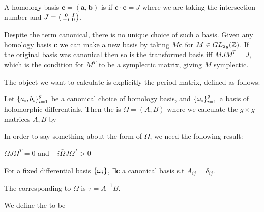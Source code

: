 \documentclass{article}
\begin{document}
\begin{definition}
	A homology basis $\bm{c} = (\bm{a},\bm{b})$ is  if $\bm{c} \cdot \bm{c} = J$ where we are taking the intersection number and $J=\begin{psmallmatrix} 0 & I \\ -I & 0 \end{psmallmatrix}$. 
\end{definition}
\begin{remark}
	Despite the term canonical, there is no unique choice of such a basis. Given any homology basis $\bm{c}$ we can make a new basis by taking $M\bm{c}$ for $M\in GL_{2g}(\mathbb{Z})$. If the original basis was canonical then so is the transformed basis iff $MJM^T = J$, which is the condition for $M^T$ to be a symplectic matrix, giving $M$ symplectic. 
\end{remark}

The object we want to calculate is explicitly the period matrix, defined as follows:
\begin{definition}\label{def: period matrix}
	Let $\left\{ a_i, b_i \right\}_{i=1}^g$ be a canonical choice of homology basis, and $\left\{ \omega_i \right\}_{i=1}^g$ a basis of holomorphic differentials. Then the  is $\Omega = (A,B)$ where we calculate the $g\times g$ matrices $A,B$ by 
\end{definition}

In order to say something about the form of $\Omega$, we need the following result:
\begin{prop}
	$\Omega J \Omega^T = 0$ and $-i\bar{\Omega}J\Omega^T > 0$
\end{prop}
\begin{corollary}
	For a fixed differential basis $\left\{ \omega_i \right\}$, $\exists \bm{c}$ a canonical basis s.t $A_{ij} = \delta_{ij}$. 
\end{corollary}

\begin{definition}
	The  corresponding to $\Omega$ is $\tau = A^{-1}B$. 
\end{definition}

\begin{definition}\label{def: Siegel upper half space}
	We define the  to be 
\end{definition}
\end{document}
